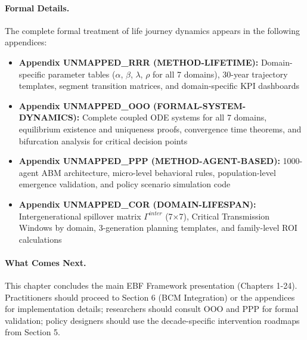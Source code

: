 {{{\vspace{0.5cm}


\paragraph{Formal Details.}
The complete formal treatment of life journey dynamics appears in the following appendices:

\begin{itemize}[nosep]
\item \textbf{Appendix UNMAPPED_RRR (METHOD-LIFETIME):} Domain-specific parameter tables ($\alpha$, $\beta$, $\lambda$, $\rho$ for all 7 domains), 30-year trajectory templates, segment transition matrices, and domain-specific KPI dashboards
\item \textbf{Appendix UNMAPPED_OOO (FORMAL-SYSTEM-DYNAMICS):} Complete coupled ODE systems for all 7 domains, equilibrium existence and uniqueness proofs, convergence time theorems, and bifurcation analysis for critical decision points
\item \textbf{Appendix UNMAPPED_PPP (METHOD-AGENT-BASED):} 1000-agent ABM architecture, micro-level behavioral rules, population-level emergence validation, and policy scenario simulation code
\item \textbf{Appendix UNMAPPED_COR (DOMAIN-LIFESPAN):} Intergenerational spillover matrix $\Gamma^{inter}$ (7×7), Critical Transmission Windows by domain, 3-generation planning templates, and family-level ROI calculations
\end{itemize}

\paragraph{What Comes Next.}
This chapter concludes the main EBF Framework presentation (Chapters 1-24). Practitioners should proceed to Section 6 (BCM Integration) or the appendices for implementation details; researchers should consult OOO and PPP for formal validation; policy designers should use the decade-specific intervention roadmaps from Section 5.


\begin{tcolorbox}[colback=green!5!white, colframe=green!75!black, title=Reading Path: What Comes Next?]


\end{tcolorbox}}}}
